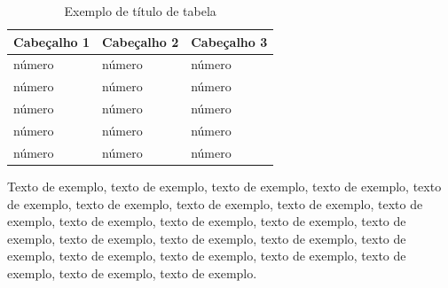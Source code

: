 \documentclass[
	12pt,				%
	oneside,			%
	a4paper,			%
	english,			%
	brazil				%
	]{abntex2ppgsi}
\begin{document}
\begin{table}[htbp]
	\centering
	\caption{Exemplo de título de tabela}
		\begin{tabular}{p{1.0in} p{1.0in} p{1.0in} } \hline
		
		Cabeçalho 1	& Cabeçalho 2	& Cabeçalho 3	 \\ \hline
		número & número	& número \\ 
		número & número	& número \\ 
		número & número	& número \\ 
		número & número	& número \\ 
		número & número	& número \\ \hline
			
		\end{tabular}
	\label{tab:ExemploDeTabela5}
\end{table}


Texto de exemplo, texto de exemplo, texto de exemplo, texto de exemplo, texto de exemplo, texto de exemplo, texto de exemplo, texto de exemplo, texto de exemplo, texto de exemplo, texto de exemplo, texto de exemplo, texto de exemplo, texto de exemplo, texto de exemplo, texto de exemplo, texto de exemplo, texto de exemplo, texto de exemplo, texto de exemplo, texto de exemplo, texto de exemplo, texto de exemplo.




\end{document}

